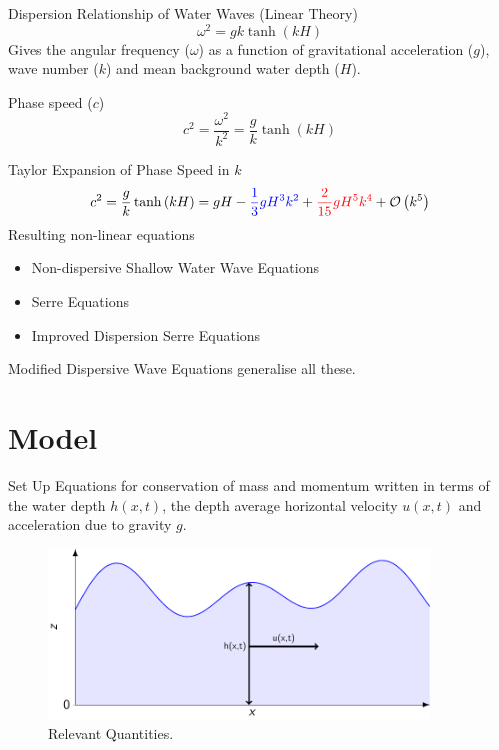 \documentclass[pdf]{beamer}
\begin{document}
\begin{frame}{Dispersion Relationship of Water Waves (Linear Theory)}
\[\omega^2 = g k \tanh\left(kH\right) \]
Gives the angular frequency ($\omega$) as a function of gravitational acceleration ($g$), wave number ($k$) and mean background water depth ($H$). 

\bigskip
Phase speed ($c$)
\[c^2 = \frac{\omega^2}{k^2} = \frac{g}{k} \tanh\left(kH\right) \]
\end{frame}

\begin{frame}{Taylor Expansion of Phase Speed in $k$}
\[c^2  = \frac{g}{k} \tanh\left(kH\right) = gH - {\color{blue}\frac{1}{3} gH^3 k^2} + {\color{red}\frac{2}{15} g H^5 k^4} + \mathcal{O}\left(k^5\right) \]
\pause
Resulting non-linear equations
\begin{itemize}
	\item Non-dispersive Shallow Water Wave Equations
	\item \color{blue} Serre Equations
	\item \color{red} Improved Dispersion Serre Equations
\end{itemize}
Modified Dispersive Wave Equations generalise all these. 
\end{frame}


\section{Model}
\begin{frame}{Set Up}
Equations for conservation of mass and momentum written in terms of the water depth $h(x,t)$, the depth average horizontal velocity $u(x,t)$ and acceleration due to gravity $g$.
\begin{figure}
	\centering
	\includegraphics[width=0.9\textwidth]{./Pics/Tex/Explanatory/Setupplot/Waves.pdf}
	\caption{Relevant Quantities.}
\end{figure}
\end{frame}
\end{document}

